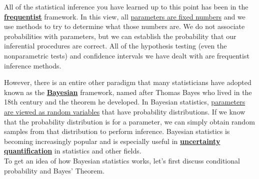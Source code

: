 \documentclass[11pt]{article}
\newcommand{\ub}[1]{{\bf \uline{#1}}}
\begin{document}
\large
\begin{center}  \end{center}

All of the statistical inference you have learned up to this point has been in the \ub{frequentist} framework. In this view, all \uline{parameters are fixed numbers} and we use methods to try to determine what those numbers are. We do not associate probabilities with parameters, but we can establish the probability that our inferential procedures are correct. All of the hypothesis testing (even the nonparametric tests) and confidence intervals we have dealt with are frequentist inference methods. 

However, there is an entire other paradigm that many statisticians have adopted known as the \ub{Bayesian} framework, named after Thomas Bayes who lived in the 18th century and the theorem he developed. In Bayesian statistics, \uline{parameters are viewed as random variables} that have probability distributions. If we know that the probability distribution is for a parameter, we can simply obtain random samples from that distribution to perform inference. Bayesian statistics is becoming increasingly popular and is especially useful in \ub{uncertainty quantification} in statistics and other fields.\\

To get an idea of how Bayesian statistics works, let's first discuss conditional probability and Bayes' Theorem. 

\end{document}
